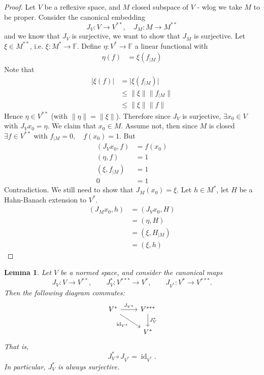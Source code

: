 \documentclass[11pt,a4paper]{article}
\theoremstyle{definition}
\theoremstyle{plain}
\newtheorem{lemma}[definition]{Lemma}
\theoremstyle{remark}
\newcommand{\F}{\mathbb{F}}
\newcommand{\abs}[1]{\lvert #1 \rvert}
\newcommand{\norm}[1]{\lVert #1 \rVert}
\newcommand{\1}{\mathbbm{1}}
\begin{document}
\begin{proof}
    Let $V$ be a reflexive space, and $M$ closed subspace of $V$ - wlog we take $M$ to be proper. Consider the canonical embedding 
    $$J_V \colon V \to V^{**}, \quad J_M \colon M \to M^{**}$$
    and we know that $J_V$ is surjective, we want to show that $J_M$ is surjective. Let $\xi \in M^{**}$, i.e. 
    $\xi \colon M^* \to \F$. Define $\eta \colon V^* \to \F$ a linear functional with 
    \begin{align*}
        \eta(f) &= \xi(f_{|M}) 
    \end{align*}
    Note that 
    \begin{align*}
        \abs{\xi(f)} &= \abs{\xi(f_{|M})} \\
        &\le \norm{\xi} \norm{f_{|M}} \\
        &\le \norm{\xi} \norm{f}
    \end{align*}
    Hence $\eta \in V^{**}$ (with $\norm{\eta} = \norm{\xi}$). Therefore since $J_V$ is surjective, $\exists x_0 \in V$ with 
    $J_V x_0 = \eta$. We claim that $x_0 \in M$. Assume not, then since $M$ is closed $\exists f \in V^{**}$ with 
    $f_{|M} = 0, \quad f(x_0) = 1$. But 
    \begin{align*}
        (J_{V} x_0, f) &= f(x_0) \\
        (\eta, f) &= 1 \\
        (\xi, f_{|M}) &= 1\\
        0 &= 1
    \end{align*}
    Contradiction. We still need to show that $J_M (x_0) = \xi$. Let $h \in M^*$, let $H$ be a Hahn-Banach extension to $V^*$. 
    \begin{align*}
       (J_M x_0, h) &= (J_V x_0, H) \\
       &= (\eta, H) \\
       &= (\xi, H_{|M}) \\
       &= (\xi, h)
    \end{align*} 
\end{proof}


\begin{lemma}
    Let \(V\) be a normed space, and consider the canonical maps
    \[
        J_V \colon V \to V^{**}, \qquad
        J_V^* \colon V^{***} \to V^*, \qquad
        J_{V^*} \colon V^* \to V^{***}.
    \]
    Then the following diagram commutes:
    \[
    \begin{tikzcd}
        V^* \arrow[r, "J_{V^*}"]
            \arrow[dr, "\operatorname{id}_{V^*}"']
        & V^{***} \arrow[d, "J_V^*"] \\
        & V^*
    \end{tikzcd}
    \]
    That is,
    \[
        J_V^* \circ J_{V^*} = \operatorname{id}_{V^*}.
    \]
    In particular, \(J_V^*\) is always surjective.
\end{lemma}
\end{document}
